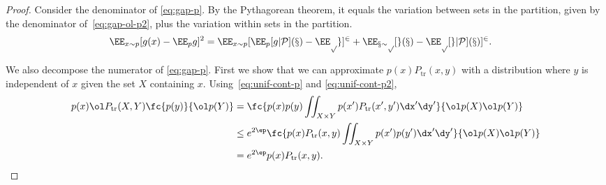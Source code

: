 \begin{proof}
Consider the denominator of \eqref{eq:gap-p}. By the Pythagorean theorem, it equals the variation between sets in the partition, given by the denominator of~\eqref{eq:gap-ol-p2}, plus the variation within sets in the partition.
\begin{align}\label{eq:denom-pythag}
\EE_{x\sim p} [g(x)-\EE_p g]^2 &= 
\EE_{x\sim p} [\EE_p[g|\cal P](x) - \EE_p g]^2 
+\EE_{x\sim p} [g(x) - \EE_p[g|\cal P](x)]^2.
\end{align}

We also decompose the numerator of \eqref{eq:gap-p}. First we show that we can approximate $p(x)P_{\text{tr}}(x,y)$ with a distribution where $y$ is independent of $x$ given the set $X$ containing $x$. Using~\eqref{eq:unif-cont-p} and \eqref{eq:unif-cont-p2},
\begin{align}
p(x) \ol P_{\text{tr}}(X,Y) \fc{p(y)}{\ol p(Y)} 
&= \fc{p(x) p(y) \iint_{X\times Y}p(x') P_{\text{tr}}(x',y')\dx'\dy'}{\ol p(X) \ol p(Y)}\\
&\le e^{2\ep}\fc{p(x) P_{\text{tr}}(x,y) \iint_{X\times Y} p(x') p(y')\dx'\dy'}{\ol p(X)\ol p(Y)}\\
& = e^{2\ep}p(x)P_{\text{tr}}(x,y).
\label{eq:decouple}
\end{align}


\end{proof}
